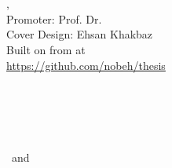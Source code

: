 \hfill
\vfill
{
	\small
	\textbf{\thesisName} \\
	\textit{\thesisTitle} \\
	\thesisSubject, \thesisDate \\
	Promoter: Prof. Dr. \thesisFirstReviewer \\
	Cover Design: Ehsan Khakbaz  \\[1.5em]
	Built on \jtt{\gitAuthorIsoDate} from \jtt{\gitHash} at \\
	\url{https://github.com/nobeh/thesis} \\[1.5em]
	\textbf{\thesisUniversity} \\
	\textit{\thesisUniversityGroup} \\
	\thesisUniversityInstitute \\
	\thesisUniversityDepartment \\
	\thesisUniversityStreetAddress \\
	\thesisUniversityPostalCode\ and \thesisUniversityCity
}
